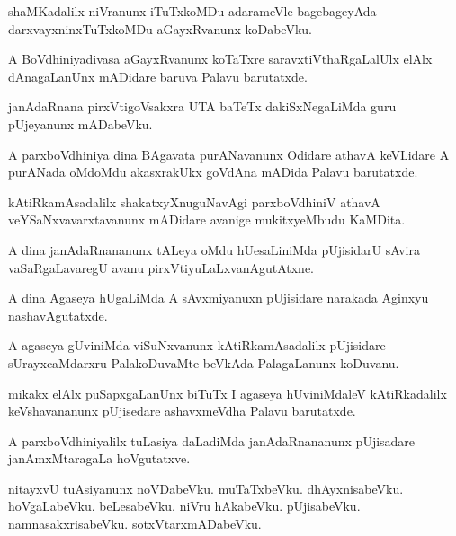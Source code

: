 \documentclass{article}
\begin{document}
\begin{mn}%
shaMKadalilx niVranunx iTuTxkoMDu adarameVle bagebageyAda darxvayxninxTuTxkoMDu aGayxRvanunx 
koDabeVku.
\end{mn}

\begin{mn}%
A BoVdhiniyadivasa aGayxRvanunx koTaTxre saravxtiVthaRgaLalUlx elAlx dAnagaLanUnx mADidare baruva 
Palavu barutatxde.
\end{mn}

\begin{mn}%
janAdaRnana pirxVtigoVsakxra UTA baTeTx dakiSxNegaLiMda guru pUjeyanunx mADabeVku.
\end{mn}

\begin{mn}%
A parxboVdhiniya dina BAgavata purANavanunx Odidare athavA keVLidare A purANada oMdoMdu akasxrakUkx 
goVdAna mADida Palavu barutatxde.
\end{mn}

\begin{mn}%
kAtiRkamAsadalilx shakatxyXnuguNavAgi parxboVdhiniV athavA veYSaNxvavarxtavanunx mADidare avanige 
mukitxyeMbudu KaMDita.
\end{mn}

\begin{mn}%
A dina janAdaRnananunx tALeya oMdu hUesaLiniMda pUjisidarU sAvira vaSaRgaLavaregU avanu 
pirxVtiyuLaLxvanAgutAtxne.
\end{mn}

\begin{mn}%
A dina Agaseya hUgaLiMda A sAvxmiyanuxn pUjisidare narakada Aginxyu nashavAgutatxde.
\end{mn}

\begin{mn}%
A agaseya gUviniMda viSuNxvanunx kAtiRkamAsadalilx pUjisidare sUrayxcaMdarxru PalakoDuvaMte beVkAda 
PalagaLanunx koDuvanu.
\end{mn}

\begin{mn}%
mikakx elAlx puSapxgaLanUnx biTuTx I agaseya hUviniMdaleV kAtiRkadalilx keVshavananunx pUjisedare 
ashavxmeVdha Palavu barutatxde.
\end{mn}

\begin{mn}%
A parxboVdhiniyalilx tuLasiya daLadiMda janAdaRnananunx pUjisadare janAmxMtaragaLa hoVgutatxve.
\end{mn}

\begin{mn}%
nitayxvU tuAsiyanunx noVDabeVku. muTaTxbeVku. dhAyxnisabeVku. hoVgaLabeVku. beLesabeVku. niVru 
hAkabeVku. pUjisabeVku. namnasakxrisabeVku. sotxVtarxmADabeVku.
\end{mn}
\end{document}
